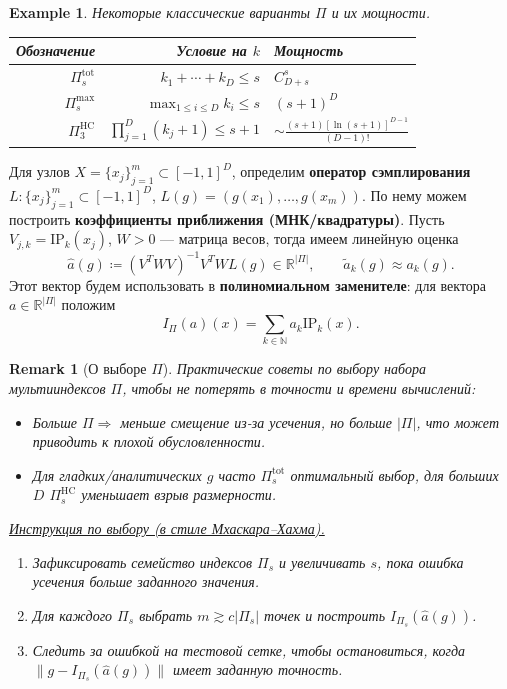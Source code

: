 \documentclass[12pt]{article}
\newtheorem{example}{Example}[section]
\newtheorem{remark}{Remark}
\begin{document}
\begin{example}
  Некоторые классические варианты \(\Pi\) и их мощности.
  \begin{table}[!h]
    \centering
    \begin{tabular}{|r|r|l|}
      \hline
      Обозначение            & Условие на \(k\)                         & Мощность                                     \\
      \hline
      \(\Pi_s^{\text{tot}}\) & \(k_1 + \cdots + k_D \le s\)             & \(C_{D + s}^s\)                              \\
      \(\Pi_s^{\max}\)       & \(\max_{1 \le i \le D}{k_i} \le s\)      & \((s + 1)^D\)                                \\
      \(\Pi_3^{\text{HC}}\)  & \(\prod_{j = 1}^{D}(k_j + 1) \le s + 1\) & \(\sim\frac{(s+1)[\ln(s+1)]^{D-1}}{(D-1)!}\) \\
      \hline
    \end{tabular}
  \end{table}
\end{example}

Для узлов \(X = \{x_j\}_{j=1}^m \subset [-1,1]^D\), определим \textbf{оператор сэмплирования} \(L\colon \{x_j\}_{j=1}^m \subset [-1,1]^D\), \(L(g) = (g(x_1), \dots, g(x_m))\).
По нему можем построить \textbf{коэффициенты приближения (МНК/квадратуры)}.
Пусть \(V_{j,k} = \mathrm{IP}_k(x_j)\), \(W > 0\) --- матрица весов, тогда имеем линейную оценка
\[\hat{a}(g) \coloneqq (V^T W V)^{-1} V^T W L(g) \in \mathbb{R}^{|\Pi|}, \qquad \tilde{a}_k(g) \approx a_k(g).\]
Этот вектор будем использовать в \textbf{полиномиальном заменителе}: для вектора \(a \in \mathbb{R}^{|\Pi|}\) положим
\[I_\Pi(a)(x) = \sum_{k \in \mathbb{N}} a_k \mathrm{IP}_k(x).\]

\begin{remark}[О выборе \(\Pi\)]
  Практические советы по выбору набора мультииндексов \(\Pi\), чтобы не потерять в точности и времени вычислений:
  \begin{itemize}
    \item Больше \(\Pi \Rightarrow\) меньше смещение из-за усечения, но больше \(|\Pi|\), что может приводить к плохой обусловленности.
    \item Для гладких/аналитических \(g\) часто \(\Pi_s^{\text{tot}}\) оптимальный выбор, для больших \(D\) \(\Pi_s^{\text{HC}}\) уменьшает взрыв размерности.
  \end{itemize}
  \underline{Инструкция по выбору (в стиле Мхаскара--Хахма).}
  \begin{enumerate}
    \item Зафиксировать семейство индексов \(\Pi_s\) и увеличивать \(s\), пока ошибка усечения больше заданного значения.
    \item Для каждого \(\Pi_s\) выбрать \(m \gtrsim c|\Pi_s|\) точек и построить \(I_{\Pi_s}(\hat{a}(g))\).
    \item Следить за ошибкой на тестовой сетке, чтобы остановиться, когда \(\|g - I_{\Pi_s}(\hat{a}(g))\|\) имеет заданную точность.
  \end{enumerate}
\end{remark}
\end{document}
